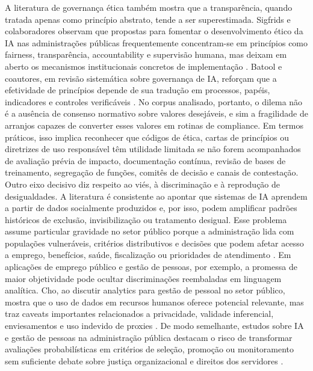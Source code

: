 \documentclass[12pt,a4paper]{article}
\begin{document}
A literatura de governança ética também mostra que a transparência, quando tratada apenas como princípio abstrato, tende a ser superestimada. Sigfrids e colaboradores observam que propostas para fomentar o desenvolvimento ético da IA nas administrações públicas frequentemente concentram-se em princípios como fairness, transparência, accountability e supervisão humana, mas deixam em aberto os mecanismos institucionais concretos de implementação \autocite{sigfrids2022how}. Batool e coautores, em revisão sistemática sobre governança de IA, reforçam que a efetividade de princípios depende de sua tradução em processos, papéis, indicadores e controles verificáveis \autocite{batool2025ai}. No corpus analisado, portanto, o dilema não é a ausência de consenso normativo sobre valores desejáveis, e sim a fragilidade de arranjos capazes de converter esses valores em rotinas de compliance. Em termos práticos, isso implica reconhecer que códigos de ética, cartas de princípios ou diretrizes de uso responsável têm utilidade limitada se não forem acompanhados de avaliação prévia de impacto, documentação contínua, revisão de bases de treinamento, segregação de funções, comitês de decisão e canais de contestação.
Outro eixo decisivo diz respeito ao viés, à discriminação e à reprodução de desigualdades. A literatura é consistente ao apontar que sistemas de IA aprendem a partir de dados socialmente produzidos e, por isso, podem amplificar padrões históricos de exclusão, invisibilização ou tratamento desigual. Esse problema assume particular gravidade no setor público porque a administração lida com populações vulneráveis, critérios distributivos e decisões que podem afetar acesso a emprego, benefícios, saúde, fiscalização ou prioridades de atendimento \autocite{pi2021machine} \autocite{serra2024a}. Em aplicações de emprego público e gestão de pessoas, por exemplo, a promessa de maior objetividade pode ocultar discriminações reembaladas em linguagem analítica. Cho, ao discutir analytics para gestão de pessoal no setor público, mostra que o uso de dados em recursos humanos oferece potencial relevante, mas traz caveats importantes relacionados a privacidade, validade inferencial, enviesamentos e uso indevido de proxies \autocite{cho2023human}. De modo semelhante, estudos sobre IA e gestão de pessoas na administração pública destacam o risco de transformar avaliações probabilísticas em critérios de seleção, promoção ou monitoramento sem suficiente debate sobre justiça organizacional e direitos dos servidores \autocite{chilunjika2022artificial} \autocite{barros2025inteligencia}.
\end{document}
